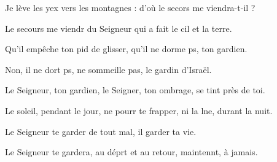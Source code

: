 \item Je lève les yex vers les montagnes :\psstar{} d’où le secors me viendra-t-il ?
\item Le secours me viendr du Seigneur\psstar{} qui a fait le cil et la terre.
\item Qu’il empêche ton pid de glisser,\psstar{} qu’il ne dorme ps, ton gardien.
\item Non, il ne dort ps, ne sommeille pas,\psstar{} le gardin d’Israël.
\item Le Seigneur, ton gardien, le Seigner, ton ombrage,\psstar{} se tint près de toi.
\item Le soleil, pendant le jour, ne pourr te frapper,\psstar{} ni la lne, durant la nuit.
\item Le Seigneur te garder de tout mal,\psstar{} il garder ta vie.
\item Le Seigneur te gardera, au déprt et au retour,\psstar{} maintennt, à jamais.